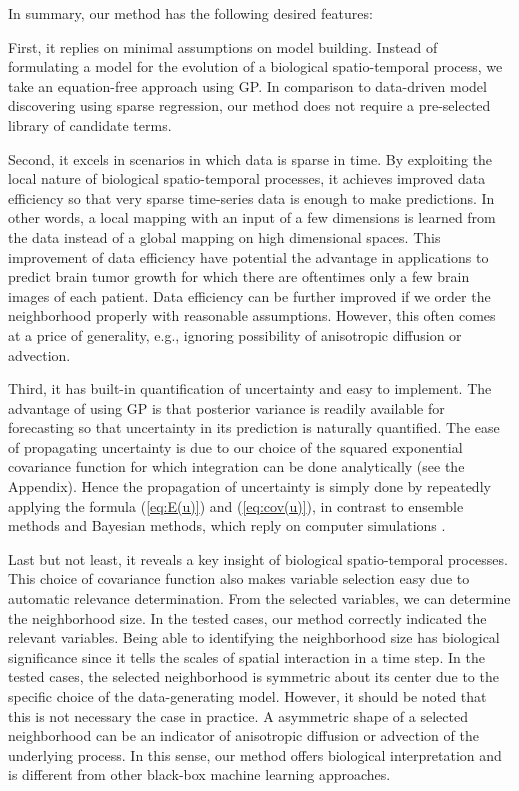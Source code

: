 \documentclass[smallextended,natbib]{svjour3}       %
\begin{document}
In summary, our method has the following desired features:

First, it replies on minimal assumptions on model building. Instead of formulating a model for the evolution of a biological spatio-temporal process, we take an equation-free approach using GP. In comparison to data-driven model discovering using sparse regression, our method does not require a pre-selected library of candidate terms.

Second, it excels in scenarios in which data is sparse in time. By exploiting the local nature of biological spatio-temporal processes, it achieves improved data efficiency so that very sparse time-series data is enough to make predictions. In other words, a local mapping with an input of a few dimensions is learned from the data instead of a global mapping on high dimensional spaces. This improvement of data efficiency have potential the advantage in applications to predict brain tumor growth for which there are oftentimes only a few brain images of each patient. Data efficiency can be further improved if we order the neighborhood properly with reasonable assumptions. However, this often comes at a price of generality, e.g., ignoring possibility of anisotropic diffusion or advection.   

Third, it has built-in quantification of uncertainty and easy to implement. The advantage of using GP is that posterior variance is readily available for forecasting so that uncertainty in its prediction is naturally quantified. The ease of propagating uncertainty is due to our choice of the squared exponential covariance function for which integration can be done analytically (see the Appendix). Hence the propagation of uncertainty is simply done by repeatedly applying the formula (\ref{eq:E(u)}) and (\ref{eq:cov(u)}), in contrast to ensemble methods and Bayesian methods, which reply on computer simulations \citep{lipkova2019personalized,Kostelich2011a}.   

Last but not least, it reveals a key insight of biological spatio-temporal processes.  This choice of covariance function also makes variable selection easy due to automatic relevance determination. From the selected variables, we can determine the neighborhood size. In the tested cases, our method correctly indicated the relevant variables. Being able to identifying the neighborhood size has biological significance since it tells the scales of spatial interaction in a time step. In the tested cases, the selected neighborhood is symmetric about its center due to the specific choice of the data-generating model. However, it should be noted that this is not necessary the case in practice. A asymmetric shape of a selected neighborhood can be an indicator of anisotropic diffusion or advection of the underlying process. In this sense, our method offers biological interpretation and is different from other black-box machine learning approaches. 
\end{document}
